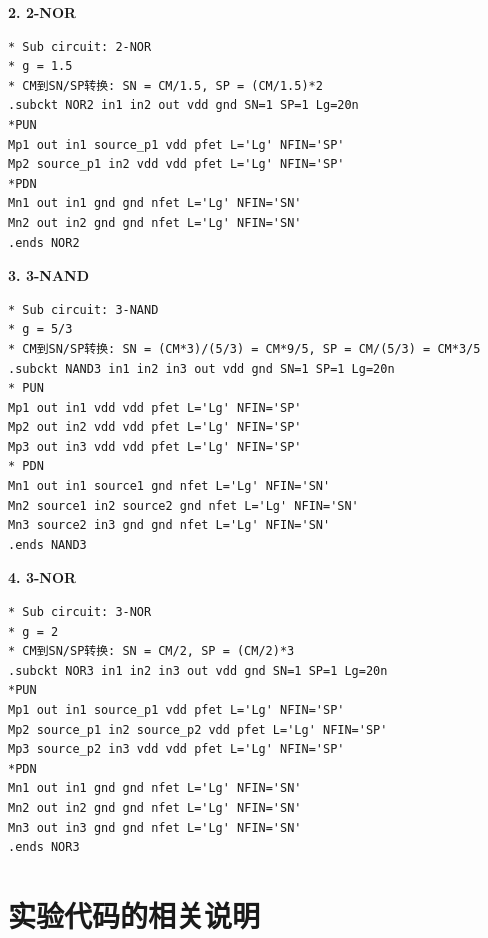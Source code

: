 \documentclass[UTF8,12pt,a4paper]{ctexart}
\begin{document}
\textbf{2. 2-NOR}
\begin{lstlisting}
* Sub circuit: 2-NOR
* g = 1.5
* CM到SN/SP转换: SN = CM/1.5, SP = (CM/1.5)*2
.subckt NOR2 in1 in2 out vdd gnd SN=1 SP=1 Lg=20n
*PUN
Mp1 out in1 source_p1 vdd pfet L='Lg' NFIN='SP'
Mp2 source_p1 in2 vdd vdd pfet L='Lg' NFIN='SP'
*PDN
Mn1 out in1 gnd gnd nfet L='Lg' NFIN='SN'
Mn2 out in2 gnd gnd nfet L='Lg' NFIN='SN'
.ends NOR2
\end{lstlisting}

\textbf{3. 3-NAND}
\begin{lstlisting}
* Sub circuit: 3-NAND
* g = 5/3
* CM到SN/SP转换: SN = (CM*3)/(5/3) = CM*9/5, SP = CM/(5/3) = CM*3/5
.subckt NAND3 in1 in2 in3 out vdd gnd SN=1 SP=1 Lg=20n
* PUN
Mp1 out in1 vdd vdd pfet L='Lg' NFIN='SP'
Mp2 out in2 vdd vdd pfet L='Lg' NFIN='SP'
Mp3 out in3 vdd vdd pfet L='Lg' NFIN='SP'
* PDN
Mn1 out in1 source1 gnd nfet L='Lg' NFIN='SN'
Mn2 source1 in2 source2 gnd nfet L='Lg' NFIN='SN'
Mn3 source2 in3 gnd gnd nfet L='Lg' NFIN='SN'
.ends NAND3
\end{lstlisting}

\textbf{4. 3-NOR}
\begin{lstlisting}
* Sub circuit: 3-NOR
* g = 2
* CM到SN/SP转换: SN = CM/2, SP = (CM/2)*3
.subckt NOR3 in1 in2 in3 out vdd gnd SN=1 SP=1 Lg=20n
*PUN
Mp1 out in1 source_p1 vdd pfet L='Lg' NFIN='SP'
Mp2 source_p1 in2 source_p2 vdd pfet L='Lg' NFIN='SP'
Mp3 source_p2 in3 vdd vdd pfet L='Lg' NFIN='SP'
*PDN
Mn1 out in1 gnd gnd nfet L='Lg' NFIN='SN'
Mn2 out in2 gnd gnd nfet L='Lg' NFIN='SN'
Mn3 out in3 gnd gnd nfet L='Lg' NFIN='SN'
.ends NOR3
\end{lstlisting}

\section{实验代码的相关说明}
\end{document}
